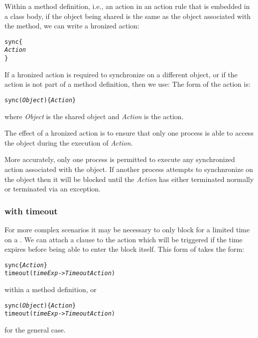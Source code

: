 Within a method definition, i.e., an action in an action rule that is embedded in a class body, if the object being shared is the same as the object associated with the method, we can write a hronized action:
\begin{alltt}
sync\{
  \emph{Action}
\}
\end{alltt}
If a hronized action is required to synchronize on a different object, or if the action is not part of a method definition, then we use:
The form of the  action is:
\begin{alltt}
sync(\emph{Object}) \{ \emph{Action} \}
\end{alltt}
where \emph{Object} is the shared object and \emph{Action} is the action.

The effect of a hronized action is to ensure that only one process is able to access the object during the execution of \emph{Action}.

More accurately, only one process is permitted to execute any synchronized action associated with the object. If another process attempts to synchnronize on the object then it will be blocked until the \emph{Action} has either terminated normally or terminated via an exception.

\subsubsection{ with timeout}
For more complex scenarios it may be necessary to only block for a limited time on a . We can attach  a  clause  to the  action which will be triggered if the time expires before being able to enter the  block itself. This form of  takes the form:
\begin{alltt}
sync\{ \emph{Action} \}
  timeout (\emph{timeExp} -> \emph{TimeoutAction})
\end{alltt}
within a method definition, or
\begin{alltt}
sync(\emph{Object})\{ \emph{Action} \} 
  timeout (\emph{timeExp} -> \emph{TimeoutAction})
\end{alltt}
for the general case.

